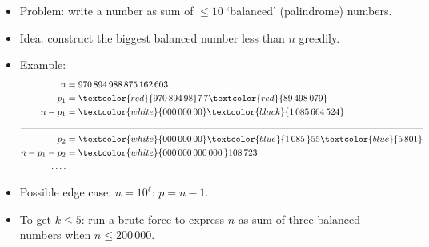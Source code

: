 \begin{frame}
	\frametitle{\problemtitle}
    \begin{itemize}
		\item Problem: write a number as sum of $\leq 10$ `balanced' (palindrome) numbers.
		\pause
		\item Idea: construct the biggest balanced number less than $n$ greedily.
		\item Example:
			\begin{align*}
				n &= 970\,894\,988\,875\,162\,603 \\
				p_1 &= \textcolor{red}{970\,894\,98}7\,7\textcolor{red}{89\,498\,079} \\
				n - p_1 &= \textcolor{white}{000\,000\,00}\textcolor{black}{1\,085\,664\,524} \\
					\cline{0-1}
				p_2 &= \textcolor{white}{000\,000\,00}\textcolor{blue}{1\,085\,}55\textcolor{blue}{5\,801} \\
				n - p_1 - p_2 &= \textcolor{white}{000\,000\,000\,000\,}108\,723 \\
				\dots.
			\end{align*}
		\item Possible edge case: $n = 10^\ell$: $p = n-1$.
		\pause
		\item To get $k \leq 5$: run a brute force to express $n$ as sum of three balanced numbers when $n \leq 200\,000$.
    \end{itemize}
\end{frame}
